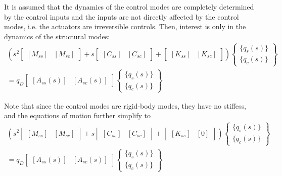 It is assumed that the dynamics of the control modes are completely determined by the control inputs and the inputs are not directly affected by the control modes, i.e. the actuators are irreversible controls. Then, interest is only in the dynamics of the structural modes:
\begin{multline}
    \left( s^2 \begin{bmatrix}
        [M_{ss}] & [M_{sc}]
    \end{bmatrix} + s \begin{bmatrix}
        [C_{ss}] & [C_{sc}]
    \end{bmatrix} + \begin{bmatrix}
        [K_{ss}] & [K_{sc}]
    \end{bmatrix} \right) \begin{Bmatrix}
        \{q_s(s)\} \\
        \{q_c(s)\}
    \end{Bmatrix} \\ = q_D \begin{bmatrix}
        [A_{ss}(s)] & [A_{sc}(s)]
    \end{bmatrix} \begin{Bmatrix}
        \{q_s(s)\} \\
        \{q_c(s)\}
    \end{Bmatrix}
\end{multline}

Note that since the control modes are rigid-body modes, they have no stiffess, and the equations of motion further simplify to
\begin{multline}
	\label{eq:EOM}
    \left( s^2 \begin{bmatrix}
        [M_{ss}] & [M_{sc}]
    \end{bmatrix} + s \begin{bmatrix}
        [C_{ss}] & [C_{sc}]
    \end{bmatrix} + \begin{bmatrix}
        [K_{ss}] & [0]
    \end{bmatrix} \right) \begin{Bmatrix}
        \{q_s(s)\} \\
        \{q_c(s)\}
    \end{Bmatrix} \\ = q_D \begin{bmatrix}
        [A_{ss}(s)] & [A_{sc}(s)]
    \end{bmatrix} \begin{Bmatrix}
        \{q_s(s)\} \\
        \{q_c(s)\}
    \end{Bmatrix}
\end{multline}

